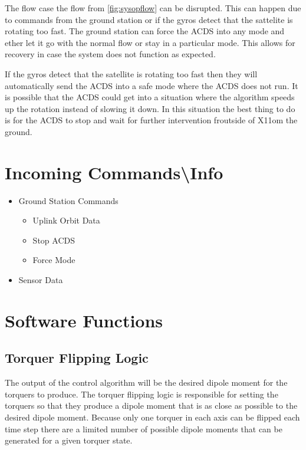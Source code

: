 The flow case the flow from \cref{fig:sysopflow} can be disrupted. This can happen due to commands from the ground station or if the gyros detect that the sattelite is rotating too fast. The ground station can force the \ac{ACDS} into any mode and ether let it go with the normal flow or stay in a particular mode. This allows for recovery in case the system does not function as expected.

If the gyros detect that the satellite is rotating too fast then they will automatically send the \ac{ACDS} into a safe mode where the \ac{ACDS} does not run. It is possible that the \ac{ACDS} could get into a situation where the algorithm speeds up the rotation instead of slowing it down. In this situation the best thing to do is for the \ac{ACDS} to stop and wait for further intervention froutside of X11om the ground.

\section{Incoming Commands\textbackslash Info}


\begin{itemize}
    \item Ground Station Commands
        \begin{itemize}
            \item Uplink Orbit Data
            \item Stop \ac{ACDS}
            \item Force Mode
        \end{itemize}
    \item Sensor Data
\end{itemize}

\section{Software Functions}


\subsection{Torquer Flipping Logic}

The output of the control algorithm will be the desired dipole moment for the torquers to produce. The torquer flipping logic is responsible for setting the torquers so that they produce a dipole moment that is as close as possible to the desired dipole moment. Because only one torquer in each axis can be flipped each time step there are a limited number of possible dipole moments that can be generated for a given torquer state.

